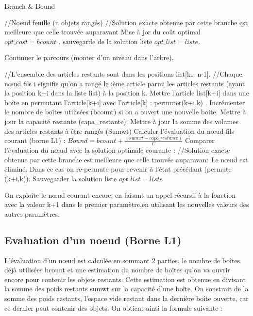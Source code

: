 \documentclass[12pt]{article}
\begin{document}
\begin{algorithm}[H]
    \caption{Branch \& Bound}
    \begin{algorithmic}
        \STATE //Noeud feuille (n objets rangés)
            \STATE //Solution exacte obtenue par cette branche est meilleure que celle trouvée auparavant
            \STATE Mise à jor du coût optimal $opt\_cost=bcount$ .
            \STATE sauvegarde de la solution liste  $opt\_list=liste$. 
        
        \ELSE
            \STATE Continuer le parcours (monter d’un niveau dans l’arbre).
       \ENDIF
        
    \ELSE

        \STATE //L’ensemble des articles restants sont dans les positions list[k… n-1].
        \STATE //Chaque nœud fils i signifie qu’on a rangé le ième article parmi les articles restants (ayant la position k+i dans la liste list) à la position k.
            \STATE Mettre l’article list[k+i] dans une boîte en permutant l’article[k+i] avec l’article[k] : permuter(k+i,k) .
            \STATE Incrémenter le nombre de boîtes utilisées (bcount) si on a ouvert une nouvelle boite.
            \STATE Mettre à jour la capacité restante (capa\_restante).
            \STATE Mettre à jour la somme des volumes des articles restants à être rangés (Sumwt)
            \STATE Calculer l’évaluation du nœud fils courant (borne L1) : $Bound=bcount+\frac{(sumwt-capa\_restante)}{C}$
            \STATE Comparer l’évaluation du nœud avec la solution optimale courante :
                \STATE //Solution exacte obtenue par cette branche est meilleure que celle trouvée auparavant
                \STATE  Le nœud est éliminé. Dans ce cas on re-permute pour revenir à l’état précédant (permute (k+i,k)). 
                \STATE Sauvegarder la solution liste  $opt\_list=liste$ 
        
           \ELSE
                \STATE On exploite le nœud courant encore, en faisant un appel récursif à la fonction avec la valeur  k+1 dans le premier paramètre,en utilisant les nouvelles valeurs des autres paramètres.
           \ENDIF


        \ENDFOR
    \ENDIF
    \end{algorithmic}
    \end{algorithm}
\subsection{Evaluation d'un noeud (Borne L1)}
L’évaluation d’un nœud est calculée en sommant 2 parties, le nombre de boîtes déjà utilisées bcount et une estimation du nombre de boîtes qu’on va ouvrir encore pour contenir les objets restants. Cette estimation est obtenue en divisant la somme des poids restants sumwt sur la capacité d’une boîte. On soustrait de la somme des poids restants, l’espace vide 
restant dans la dernière boîte ouverte, car ce dernier peut contenir des objets. On obtient ainsi la formule suivante :  
\end{document}
